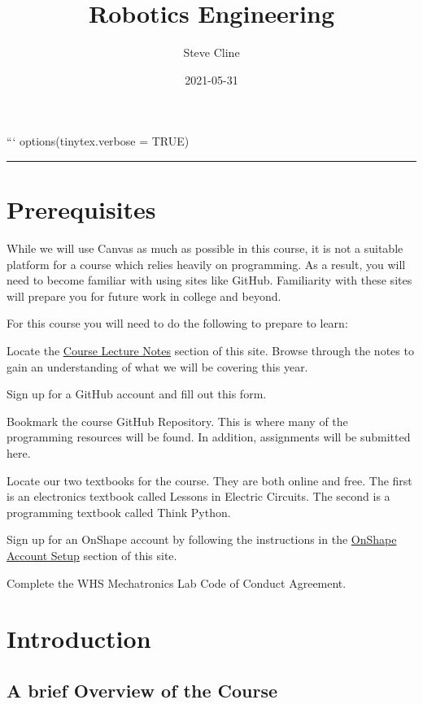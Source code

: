 \documentclass[
]{book}
\title{Robotics Engineering}
\author{Steve Cline}
\date{2021-05-31}
\begin{document}
\maketitle

{
\setcounter{tocdepth}{1}
\tableofcontents
}
```
options(tinytex.verbose = TRUE)

\begin{center}\rule{0.5\linewidth}{0.5pt}\end{center}

\hypertarget{prerequisites}{%
\chapter{Prerequisites}\label{prerequisites}}

While we will use Canvas as much as possible in this course, it is not a suitable platform for a course which relies heavily on programming. As a result, you will need to become familiar with using sites like GitHub. Familiarity with these sites will prepare you for future work in college and beyond.

For this course you will need to do the following to prepare to learn:

Locate the \protect\hyperlink{course-lecture-notes}{Course Lecture Notes} section of this site. Browse through the notes to gain an understanding of what we will be covering this year.

Sign up for a GitHub account and fill out this form.

Bookmark the course GitHub Repository. This is where many of the programming resources will be found. In addition, assignments will be submitted here.

Locate our two textbooks for the course. They are both online and free. The first is an electronics textbook called Lessons in Electric Circuits. The second is a programming textbook called Think Python.

Sign up for an OnShape account by following the instructions in the \protect\hyperlink{onshape-account-setup}{OnShape Account Setup} section of this site.

Complete the WHS Mechatronics Lab Code of Conduct Agreement.

\hypertarget{intro}{%
\chapter{Introduction}\label{intro}}

\hypertarget{a-brief-overview-of-the-course}{%
\section{A brief Overview of the Course}\label{a-brief-overview-of-the-course}}
\end{document}
